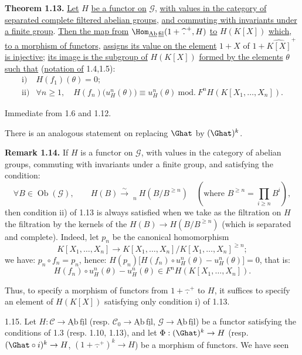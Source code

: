 \textbf{Theorem 1.13.} \uline{Let} \(H\) \uline{be a functor on} \(\mathcal G\), \uline{with values in the category of separated complete filtered abelian groups}, \uline{and commuting with invariants under a finite group}. \uline{Then the map from} \(\Hom_{\underline{\mathrm{Ab}}\,\underline{\mathrm{fil}}}(1+\widehat{\,\mathord{.}\,}^{+},H)\) \uline{to} \(H(K[X])\) \uline{which}, \uline{to a morphism of functors}, \uline{assigns its value on the element}
%
\(1+X\) of \(1+\widehat{K[X]}^+\) \uline{is injective}; \uline{its image is the subgroup of} \(H(K[X])\) \uline{formed by the elements} \(\theta\) \uline{such that} (\uline{notation of} 1.4,1.5):
\[
\begin{array}{ll}
\text{i)}& H(f_1)(\theta)=0;\\[0.3em]
\text{ii)}& \forall n\geq1,\quad
H(f_n)\bigl(u_H^n(\theta)\bigr)\equiv u_H^n(\theta)
\ \mathrm{mod.}\ F^nH(K[X_1,\ldots,X_n]).
\end{array}
\]

Immediate from 1.6 and 1.12.

There is an analogous statement on replacing \(\Ghat\) by \((\Ghat)^k\).

\textbf{Remark 1.14.} If \(H\) is a functor on \(\mathcal G\), with values in the category of abelian groups, commuting with invariants under a finite group, and satisfying the condition:
\[
  \forall B\in\operatorname{Ob}(\mathcal G),\qquad
  H(B)\xrightarrow{\sim}\mathop{\underleftarrow{\mathrm{Lim}}}\limits_n H(B/B^{\geq n})\quad(\text{where }B^{\geq n}=\prod_{i\geq n}B^i),
\]
then condition ii) of 1.13 is always satisfied when we take as the filtration on \(H\) the filtration by the kernels of the \(H(B)\longrightarrow H(B/B^{\geq n})\) (which is separated and complete). Indeed, let \(p_n\) be the canonical homomorphism
\[
  K[X_1,\ldots,X_n]\longrightarrow K[X_1,\ldots,X_n]/K[X_1,\ldots,X_n]^{\geq n};
\]
we have: \(p_n\circ f_n=p_n\), hence: \(H(p_n)\bigl[H(f_n)\circ u_H^n(\theta)-u_H^n(\theta)\bigr]=0\), that is:
\[
  H(f_n)\circ u_H^n(\theta)-u_H^n(\theta)
  \in F^nH(K[X_1,\ldots,X_n]).
\]

Thus, to specify a morphism of functors from \(1+\widehat{\,\mathord{.}\,}^{+}\) to \(H\), it suffices to specify an element of \(H(K[X])\) satisfying only condition i) of 1.13.

1.15. Let \(H:\mathcal C\to\underline{\mathrm{Ab}}\,\underline{\mathrm{fil}}\) (resp. \(\mathcal C_0\to\underline{\mathrm{Ab}}\,\underline{\mathrm{fil}}\), \(\mathcal G\to\underline{\mathrm{Ab}}\,\underline{\mathrm{fil}}\)) be a functor satisfying the conditions of 1.3 (resp. 1.10, 1.13), and let \(\Phi:(\Ghat)^k\to H\) (resp. \((\Ghat\circ i)^k\to H\), \((1+\widehat{\,\mathord{.}\,}^{+})^k\to H\)) be a morphism of functors. We have seen
